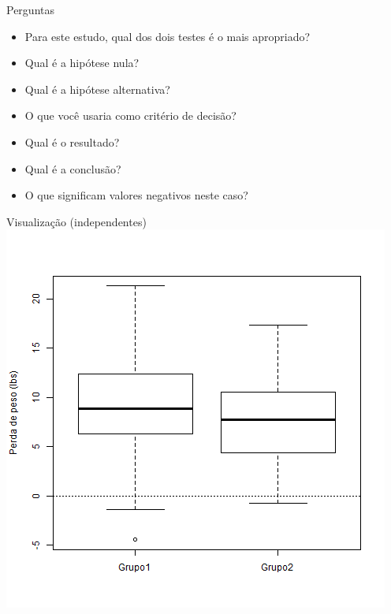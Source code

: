 \documentclass{beamer}
\begin{document}
\begin{frame}[label=perguntas]{Perguntas}
  \begin{itemize}
  \item Para este estudo, qual dos dois testes é o mais apropriado?
  \item Qual é a hipótese nula?
  \item Qual é a hipótese alternativa?
  \item O que você usaria como critério de decisão?
  \item Qual é o resultado?
  \item Qual é a conclusão?
  \item O que significam valores negativos neste caso?
  \end{itemize}
\end{frame}

\begin{frame}{Visualização (independentes)}
  \includegraphics[height=\textheight]{Teste_t/2-amostras-independentes}
\end{frame}
\end{document}
